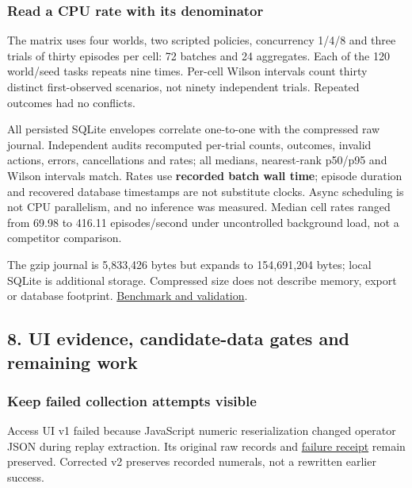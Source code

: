 \documentclass[
  11pt,
  letterpaper,
]{article}
\begin{document}
\subsubsection{Read a CPU rate with its
denominator}\label{read-a-cpu-rate-with-its-denominator}

The matrix uses four worlds, two scripted policies, concurrency 1/4/8
and three trials of thirty episodes per cell: 72 batches and 24
aggregates. Each of the 120 world/seed tasks repeats nine times.
Per-cell Wilson intervals count thirty distinct first-observed
scenarios, not ninety independent trials. Repeated outcomes had no
conflicts.

All persisted SQLite envelopes correlate one-to-one with the compressed
raw journal. Independent audits recomputed per-trial counts, outcomes,
invalid actions, errors, cancellations and rates; all medians,
nearest-rank p50/p95 and Wilson intervals match. Rates use
\textbf{recorded batch wall time}; episode duration and recovered
database timestamps are not substitute clocks. Async scheduling is not
CPU parallelism, and no inference was measured. Median cell rates ranged
from 69.98 to 416.11 episodes/second under uncontrolled background load,
not a competitor comparison.

The gzip journal is 5,833,426 bytes but expands to 154,691,204 bytes;
local SQLite is additional storage. Compressed size does not describe
memory, export or database footprint.
\href{../../artifacts/benchmarks/20261010-four-world-v1/independent-validation.json}{Benchmark
and validation}.

\subsection{8. UI evidence, candidate-data gates and remaining
work}\label{ui-evidence-candidate-data-gates-and-remaining-work}

\subsubsection{Keep failed collection attempts
visible}\label{keep-failed-collection-attempts-visible}

Access UI v1 failed because JavaScript numeric reserialization changed
operator JSON during replay extraction. Its original raw records and
\href{../../artifacts/access-provisioning/20261010-ui-v1/failure.json}{failure
receipt} remain preserved. Corrected v2 preserves recorded numerals, not
a rewritten earlier success.
\end{document}
